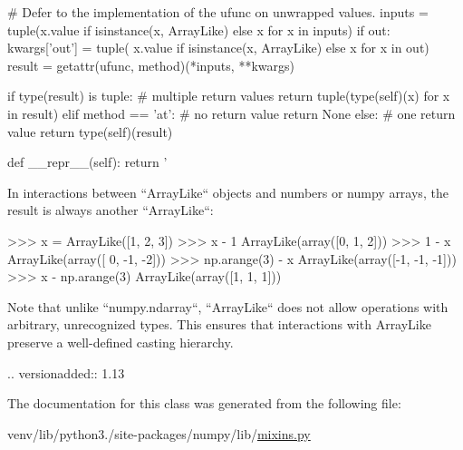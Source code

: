 \begin{DoxyVerb}
            # Defer to the implementation of the ufunc on unwrapped values.
            inputs = tuple(x.value if isinstance(x, ArrayLike) else x
                           for x in inputs)
            if out:
                kwargs['out'] = tuple(
                    x.value if isinstance(x, ArrayLike) else x
                    for x in out)
            result = getattr(ufunc, method)(*inputs, **kwargs)

            if type(result) is tuple:
                # multiple return values
                return tuple(type(self)(x) for x in result)
            elif method == 'at':
                # no return value
                return None
            else:
                # one return value
                return type(self)(result)

        def __repr__(self):
            return '%

In interactions between ``ArrayLike`` objects and numbers or numpy arrays,
the result is always another ``ArrayLike``:

    >>> x = ArrayLike([1, 2, 3])
    >>> x - 1
    ArrayLike(array([0, 1, 2]))
    >>> 1 - x
    ArrayLike(array([ 0, -1, -2]))
    >>> np.arange(3) - x
    ArrayLike(array([-1, -1, -1]))
    >>> x - np.arange(3)
    ArrayLike(array([1, 1, 1]))

Note that unlike ``numpy.ndarray``, ``ArrayLike`` does not allow operations
with arbitrary, unrecognized types. This ensures that interactions with
ArrayLike preserve a well-defined casting hierarchy.

.. versionadded:: 1.13
\end{DoxyVerb}
 

The documentation for this class was generated from the following file\+:\begin{DoxyCompactItemize}
\item 
venv/lib/python3./site-\/packages/numpy/lib/\hyperlink{mixins_8py}{mixins.\+py}\end{DoxyCompactItemize}
